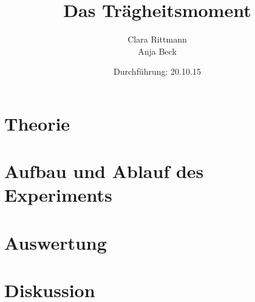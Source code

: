 \documentclass[a4,12pt]{article}
\title{Das Trägheitsmoment}
\author{Clara Rittmann \\ Anja Beck}
\date{Durchführung: 20.10.15}
\begin{document}
	\maketitle
	\date{}
	\tableofcontents
	
	\section{Theorie}
	

	\section{Aufbau und Ablauf des Experiments}
	


%	
%	
%	
%	

%	

	\section{Auswertung}
	

	\section{Diskussion}
	
\end{document}

